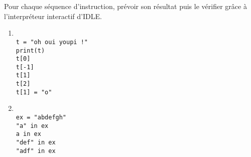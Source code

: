 \exer{}
\setcounter{numques}{0}

Pour chaque séquence d'instruction, prévoir son résultat puis le vérifier grâce à l'interpréteur interactif d'IDLE.

\begin{enumerate}[label=\emph{\alph*)}]
\item 
\begin{lstlisting}

t = "oh oui youpi !"
print(t)
t[0]
t[-1]
t[1]
t[2]
t[1] = "o" 
\end{lstlisting}

\item 
\begin{lstlisting}

ex = "abdefgh"
"a" in ex
a in ex
"def" in ex
"adf" in ex
\end{lstlisting}

\end{enumerate}